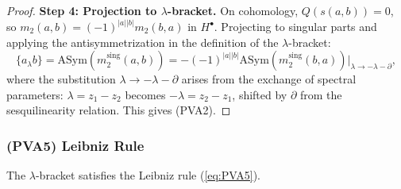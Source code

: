 \begin{proof}
\textbf{Step 4: Projection to $\lambda$-bracket.}
On cohomology, $Q(s(a,b)) = 0$, so $m_2(a,b) = (-1)^{|a||b|} m_2(b,a)$ in $H^\bullet$. Projecting to singular parts and applying the antisymmetrization in the definition of the $\lambda$-bracket:
\[
\{a_\lambda b\} = \mathrm{ASym}(m_2^{\mathrm{sing}}(a,b)) = -(-1)^{|a||b|} \mathrm{ASym}(m_2^{\mathrm{sing}}(b,a))\big|_{\lambda \to -\lambda - \partial},
\]
where the substitution $\lambda \to -\lambda - \partial$ arises from the exchange of spectral parameters: $\lambda = z_1 - z_2$ becomes $-\lambda = z_2 - z_1$, shifted by $\partial$ from the sesquilinearity relation. This gives (PVA2).
\end{proof}

\subsubsection{(PVA5) Leibniz Rule}

\begin{proposition}
The $\lambda$-bracket satisfies the Leibniz rule (\ref{eq:PVA5}).
\end{proposition}

